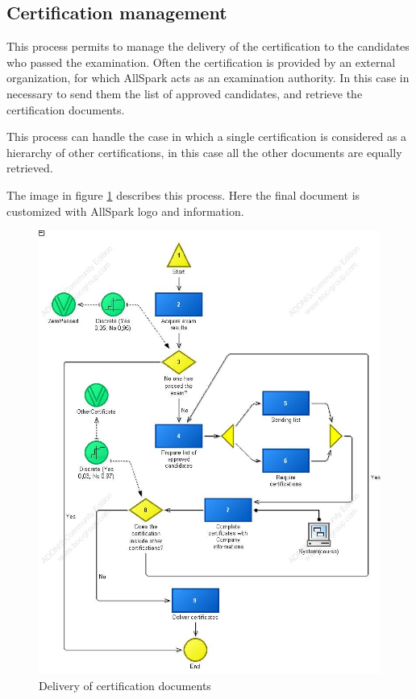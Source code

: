 \subsection{Certification management}
This process permits to manage the delivery of the certification to the
candidates who passed the examination. Often the certification is provided
by an external organization, for which AllSpark acts as an examination
authority. In this case in necessary to send them the list of approved
candidates, and retrieve the certification documents.

This process can handle the case in which a single certification is
considered as a hierarchy of other certifications, in this case all the
other documents are equally retrieved.

The image in figure \ref{2img:certification} describes this process. Here
the final document is customized with AllSpark logo and information.

\begin{figure}[!ht]
\centering
\includegraphics[scale=0.55]{assign2/adonis/imgs/certification.jpg}
\caption{Delivery of certification documents}
\label{2img:certification}
\end{figure}

